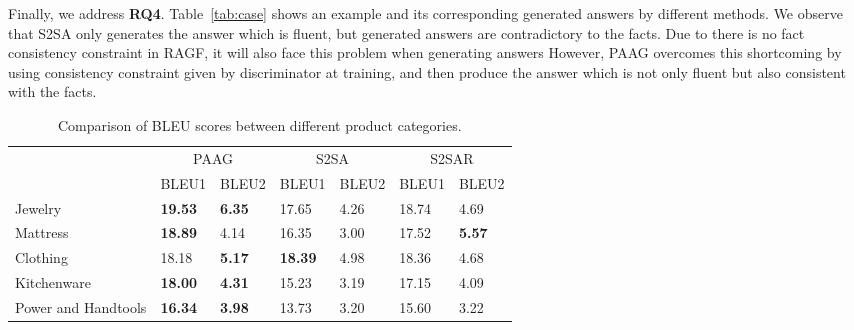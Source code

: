 Finally, we address \textbf{RQ4}. Table~\ref{tab:case} shows an example and its corresponding generated answers by different methods.
We observe that S2SA only generates the answer which is fluent, but generated answers are contradictory to the facts.
Due to there is no fact consistency constraint in RAGF, it will also face this problem when generating answers
However, PAAG overcomes this shortcoming by using consistency constraint given by discriminator at training, and then produce the answer which is not only fluent but also consistent with the facts.

\begin{table}[t]
\centering
\caption{Comparison of BLEU scores between different product categories.}
\vspace{-4mm}
\label{tab:comp_domains}
\scriptsize
\begin{tabular}{lllllll}
\toprule
                                           & \multicolumn{2}{c}{PAAG}                                                            & \multicolumn{2}{c}{S2SA}                                                            & \multicolumn{2}{c}{S2SAR}                                                         \\ \cline{2-7} 
                                            & \multicolumn{1}{c}{BLEU1} & \multicolumn{1}{c}{BLEU2}& \multicolumn{1}{c}{BLEU1} & \multicolumn{1}{c}{BLEU2} & \multicolumn{1}{c}{BLEU1} & \multicolumn{1}{c}{BLEU2} \\ \hline
\multicolumn{1}{l|}{Jewelry}                & \textbf{19.53}                   & \multicolumn{1}{l|}{\textbf{6.35}}                     & 17.65                   & \multicolumn{1}{l|}{4.26}                      & 18.74                   & 4.69                 \\
\multicolumn{1}{l|}{Mattress}           & \textbf{18.89}                   & \multicolumn{1}{l|}{4.14}   & 16.35                   & \multicolumn{1}{l|}{3.00}    & 17.52                   & \textbf{5.57}       \\
\multicolumn{1}{l|}{Clothing}               & 18.18                   & \multicolumn{1}{l|}{\textbf{5.17}} & \textbf{18.39}                   & \multicolumn{1}{l|}{4.98}  & 18.36                    & 4.68   \\
\multicolumn{1}{l|}{Kitchenware}            & \textbf{18.00}                   & \multicolumn{1}{l|}{\textbf{4.31}} & 15.23                    & \multicolumn{1}{l|}{3.19} & 17.15                   & 4.09   \\
\multicolumn{1}{l|}{Power and Handtools}     & \textbf{16.34 }                  & \multicolumn{1}{l|}{\textbf{3.98}} & 13.73                   & \multicolumn{1}{l|}{3.20} & 15.60                   & 3.22 \\

\end{tabular}
\end{table}
